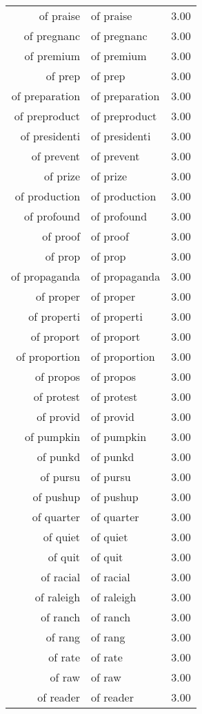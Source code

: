 \begin{table}[ht]
\begin{tabular}{rlr}
  of praise & of praise & 3.00 \\ 
  of pregnanc & of pregnanc & 3.00 \\ 
  of premium & of premium & 3.00 \\ 
  of prep & of prep & 3.00 \\ 
  of preparation & of preparation & 3.00 \\ 
  of preproduct & of preproduct & 3.00 \\ 
  of presidenti & of presidenti & 3.00 \\ 
  of prevent & of prevent & 3.00 \\ 
  of prize & of prize & 3.00 \\ 
  of production & of production & 3.00 \\ 
  of profound & of profound & 3.00 \\ 
  of proof & of proof & 3.00 \\ 
  of prop & of prop & 3.00 \\ 
  of propaganda & of propaganda & 3.00 \\ 
  of proper & of proper & 3.00 \\ 
  of properti & of properti & 3.00 \\ 
  of proport & of proport & 3.00 \\ 
  of proportion & of proportion & 3.00 \\ 
  of propos & of propos & 3.00 \\ 
  of protest & of protest & 3.00 \\ 
  of provid & of provid & 3.00 \\ 
  of pumpkin & of pumpkin & 3.00 \\ 
  of punkd & of punkd & 3.00 \\ 
  of pursu & of pursu & 3.00 \\ 
  of pushup & of pushup & 3.00 \\ 
  of quarter & of quarter & 3.00 \\ 
  of quiet & of quiet & 3.00 \\ 
  of quit & of quit & 3.00 \\ 
  of racial & of racial & 3.00 \\ 
  of raleigh & of raleigh & 3.00 \\ 
  of ranch & of ranch & 3.00 \\ 
  of rang & of rang & 3.00 \\ 
  of rate & of rate & 3.00 \\ 
  of raw & of raw & 3.00 \\ 
  of reader & of reader & 3.00 \\ 

\end{tabular}
\end{table}
